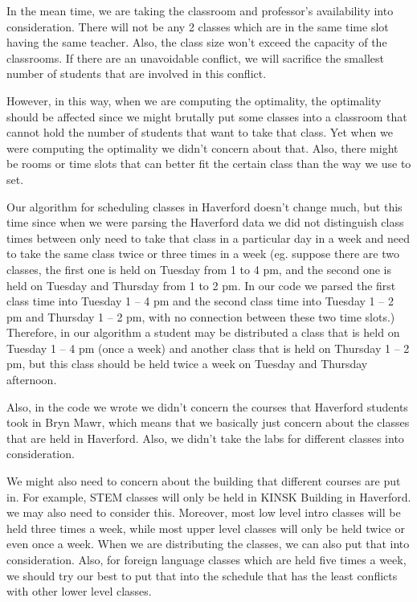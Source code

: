 \documentclass[11pt, oneside]{article}   	%
\begin{document}
In the mean time, we are taking the classroom and professor's availability into consideration. There will not be any 2 classes which are in the same time slot having the same teacher. Also, the class size won't exceed the capacity of the classrooms. If there are an unavoidable conflict, we will sacrifice the smallest number of students that are involved in this conflict.

However, in this way, when we are computing the optimality, the optimality should be affected since we might brutally put some classes into a classroom that cannot hold the number of students that want to take that class. Yet when we were computing the optimality we didn't concern about that. Also, there might be rooms or time slots that can better fit the certain class than the way we use to set.

Our algorithm for scheduling classes in Haverford doesn't change much, but this time since when we were parsing the Haverford data we did not distinguish class times between only need to take that class in a particular day in a week and need to take the same class twice or three times in a week (eg. suppose there are two classes, the first one is held on Tuesday from 1 to 4 pm, and the second one is held on Tuesday and Thursday from 1 to 2 pm. In our code we parsed the first class time into Tuesday 1 -- 4 pm and the second class time into Tuesday 1 -- 2 pm and Thursday 1 -- 2 pm, with no connection between these two time slots.) Therefore, in our algorithm a student may be distributed a class that is held on Tuesday 1 -- 4 pm (once a week) and another class that is held on Thursday 1 -- 2 pm, but this class should be held twice a week on Tuesday and Thursday afternoon.

Also, in the code we wrote we didn't concern the courses that Haverford students took in Bryn Mawr, which means that we basically just concern about the classes that are held in Haverford. Also, we didn't take the labs for different classes into consideration.

We might also need to concern about the building that different courses are put in. For example, STEM classes will only be held in KINSK Building in Haverford. we may also need to consider this. Moreover, most low level intro classes will be held three times a week, while most upper level classes will only be held twice or even once a week. When we are distributing the classes, we can also put that into consideration. Also, for foreign language classes which are held five times a week, we should try our best to put that into the schedule that has the least conflicts with other lower level classes. 
\end{document}

